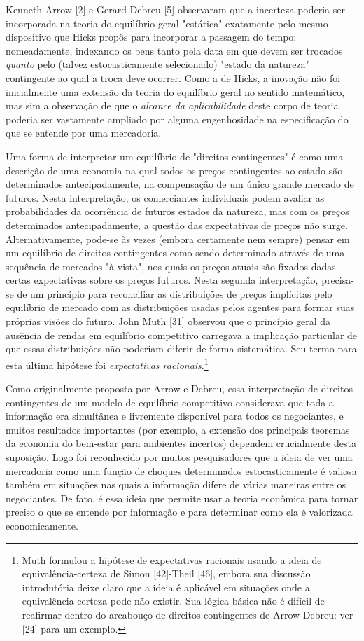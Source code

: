 \documentclass[12pt]{article}
\begin{document}
Kenneth Arrow [2] e Gerard Debreu [5] observaram que a incerteza poderia ser incorporada na teoria do equilíbrio geral "estática" exatamente pelo mesmo dispositivo que Hicks propôs para incorporar a passagem do tempo: nomeadamente, indexando os bens tanto pela data em que devem ser trocados \textit{quanto} pelo (talvez estocasticamente selecionado) "estado da natureza" contingente ao qual a troca deve ocorrer. Como a de Hicks, a inovação não foi inicialmente uma extensão da teoria do equilíbrio geral no sentido matemático, mas sim a observação de que o \textit{alcance da aplicabilidade} deste corpo de teoria poderia ser vastamente ampliado por alguma engenhosidade na especificação do que se entende por uma mercadoria.

Uma forma de interpretar um equilíbrio de "direitos contingentes" é como uma descrição de uma economia na qual todos os preços contingentes ao estado são determinados antecipadamente, na compensação de um único grande mercado de futuros. Nesta interpretação, os comerciantes individuais podem avaliar as probabilidades da ocorrência de futuros estados da natureza, mas com os preços determinados antecipadamente, a questão das expectativas de preços não surge. Alternativamente, pode-se às vezes (embora certamente nem sempre) pensar em um equilíbrio de direitos contingentes como sendo determinado através de uma sequência de mercados "à vista", nos quais os preços atuais são fixados dadas certas expectativas sobre os preços futuros. Nesta segunda interpretação, precisa-se de um princípio para reconciliar as distribuições de preços implícitas pelo equilíbrio de mercado com as distribuições usadas pelos agentes para formar suas próprias visões do futuro. John Muth [31] observou que o princípio geral da ausência de rendas em equilíbrio competitivo carregava a implicação particular de que essas distribuições não poderiam diferir de forma sistemática. Seu termo para esta última hipótese foi \textit{expectativas racionais}.\footnote{Muth formulou a hipótese de expectativas racionais usando a ideia de equivalência-certeza de Simon [42]-Theil [46], embora sua discussão introdutória deixe claro que a ideia é aplicável em situações onde a equivalência-certeza pode não existir. Sua lógica básica não é difícil de reafirmar dentro do arcabouço de direitos contingentes de Arrow-Debreu: ver [24] para um exemplo.}

Como originalmente proposta por Arrow e Debreu, essa interpretação de direitos contingentes de um modelo de equilíbrio competitivo considerava que toda a informação era simultânea e livremente disponível para todos os negociantes, e muitos resultados importantes (por exemplo, a extensão dos principais teoremas da economia do bem-estar para ambientes incertos) dependem crucialmente desta suposição. Logo foi reconhecido por muitos pesquisadores que a ideia de ver uma mercadoria como uma função de choques determinados estocasticamente é valiosa também em situações nas quais a informação difere de várias maneiras entre os negociantes. De fato, é essa ideia que permite usar a teoria econômica para tornar preciso o que se entende por informação e para determinar como ela é valorizada economicamente.
\end{document}
